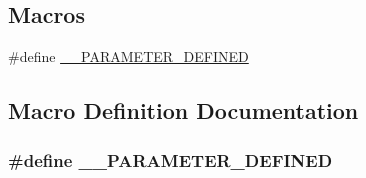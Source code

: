 \subsection*{Macros}
\begin{DoxyCompactItemize}
\item 
\#define \hyperlink{contrafold_2_parameter_manager_8ipp_a66cf9a216f534741a26c06972ff0f03e}{\+\_\+\+\_\+\+P\+A\+R\+A\+M\+E\+T\+E\+R\+\_\+\+D\+E\+F\+I\+N\+E\+D}
\end{DoxyCompactItemize}


\subsection{Macro Definition Documentation}
\hypertarget{contrafold_2_parameter_manager_8ipp_a66cf9a216f534741a26c06972ff0f03e}{
\subsubsection[{\+\_\+\+\_\+\+P\+A\+R\+A\+M\+E\+T\+E\+R\+\_\+\+D\+E\+F\+I\+N\+E\+D}]{\setlength{\rightskip}{0pt plus 5cm}\#define \+\_\+\+\_\+\+P\+A\+R\+A\+M\+E\+T\+E\+R\+\_\+\+D\+E\+F\+I\+N\+E\+D}}\label{contrafold_2_parameter_manager_8ipp_a66cf9a216f534741a26c06972ff0f03e}
